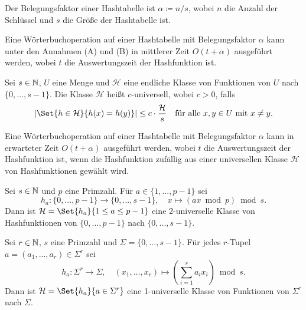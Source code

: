 \documentclass{cheat-sheet}
\begin{document}
\begin{defn}
  Der Belegungsfaktor einer Hashtabelle ist $\alpha \coloneqq n / s$, wobei $n$ die Anzahl der Schlüssel und $s$ die Größe der Hashtabelle ist.
\end{defn}

\begin{satz}
  Eine Wörterbuchoperation auf einer Hashtabelle mit Belegungsfaktor $\alpha$ kann unter den Annahmen (A) und (B) in mittlerer Zeit $O(t + \alpha)$ ausgeführt werden, wobei $t$ die Auswertungszeit der Hashfunktion ist.
\end{satz}



\begin{defn}
  Sei $s \in \mathbb{N}$, $U$ eine Menge und $\mathcal{H}$ eine endliche Klasse von Funktionen von $U$ nach $\{ 0, ..., s-1 \}$. Die Klasse $\mathcal{H}$ heißt $c$-universell, wobei $c > 0$, falls
  \[
    \abs{\Set{h \in \mathcal{H}}{ h(x) = h(y) }} \leq c \cdot \frac{\mathcal H}{s} \quad \text{für alle $x, y \in U$ mit $x \not= y$.}
  \]
\end{defn}

\begin{satz}
  Eine Wörterbuchoperation auf einer Hashtabelle mit Belegungsfaktor $\alpha$ kann in erwarteter Zeit $O(t + \alpha)$ ausgeführt werden, wobei $t$ die Auswertungszeit der Hashfunktion ist, wenn die Hashfunktion zufällig aus einer universellen Klasse $\mathcal{H}$ von Hashfunktionen gewählt wird.
\end{satz}

\begin{lem}
  Sei $s \in \mathbb{N}$ und $p$ eine Primzahl. Für $a \in \{ 1, ..., p-1 \}$ sei
  \[
    h_a : \{ 0, ..., p{-}1 \} \to \{ 0, ..., s{-}1 \}, \quad
    x \mapsto (ax \bmod p) \bmod s.
  \]
  Dann ist $\mathcal{H} = \Set{h_a}{1 \leq a \leq p-1}$ eine 2-universelle Klasse von Hashfunktionen von $\{ 0, ..., p{-}1 \}$ nach $\{ 0, ..., s{-}1 \}$.
\end{lem}

\begin{lem}
  Sei $r \in \mathbb{N}$, $s$ eine Primzahl und $\Sigma = \{ 0, ..., s{-}1 \}$. Für jedes $r$-Tupel $a = (a_1, ..., a_r) \in \Sigma^r$ sei
  \[
    h_a : \Sigma^r \to \Sigma, \quad
    (x_1, ..., x_r) \mapsto \left( \sum_{i=1}^r a_i x_i \right) \bmod s.
  \]
  Dann ist $\mathcal{H} = \Set{h_a}{a \in \Sigma^r}$ eine 1-universelle Klasse von Funktionen von $\Sigma^r$ nach $\Sigma$.
\end{lem}
\end{document}
